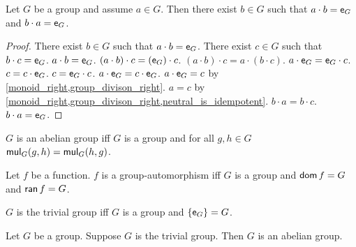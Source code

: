 \begin{proposition}\label{leftinverse_eq_rightinverse}
    Let $G$ be a group and assume $a \in G$.
    Then there exist $b\in G$ 
    such that $a \cdot b = \neutral[G]$ and $b \cdot a = \neutral[G]$.
\end{proposition}
\begin{proof}
    There exist $b \in G$ such that $a \cdot b = \neutral[G]$.
    There exist $c \in G$ such that $b \cdot c = \neutral[G]$.
    $a \cdot b = \neutral[G]$.
    $(a \cdot b) \cdot c = (\neutral[G]) \cdot c$.
    $(a \cdot b) \cdot c = a \cdot (b \cdot c)$.
    $a \cdot \neutral[G] = \neutral[G] \cdot c$.
    $c = c \cdot \neutral[G]$.
    $c = \neutral[G] \cdot c$.
    $a \cdot \neutral[G] = c \cdot \neutral[G]$.
    $a \cdot \neutral[G] = c$ by \cref{monoid_right,group_divison_right}.
    $a = c$ by \cref{monoid_right,group_divison_right,neutral_is_idempotent}.
    $b \cdot a = b \cdot c$.
    $b \cdot a = \neutral[G]$.
\end{proof}

\begin{definition}\label{group_abelian}
    $G$ is an abelian group iff $G$ is a group and for all $g,h \in G$ $\mul[G](g,h) = \mul[G](h,g)$. 
\end{definition}


\begin{definition}\label{group_automorphism}
    Let $f$ be a function. $f$ is a group-automorphism iff $G$ is a group and $\dom{f}=G$ and $\ran{f}=G$. 
\end{definition}

\begin{definition}\label{trivial_group}
    $G$ is the trivial group iff $G$ is a group and $\{\neutral[G]\}=G$.
\end{definition}

\begin{theorem}\label{trivial_implies_abelian}
    Let $G$ be a group.
    Suppose $G$ is the trivial group.
    Then $G$ is an abelian group.
\end{theorem}
